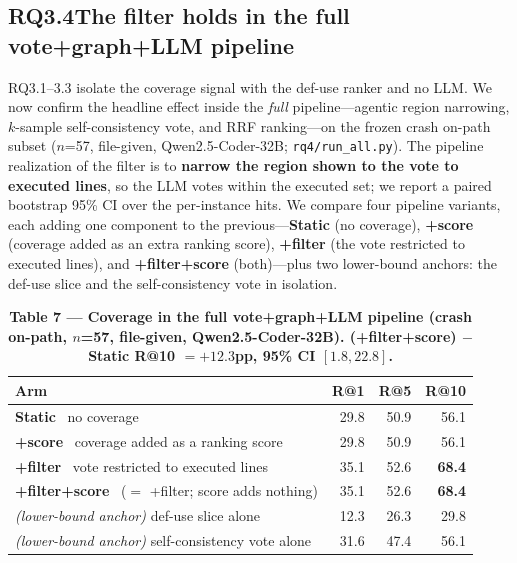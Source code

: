 \documentclass[11pt]{article}
\newcommand{\code}[1]{\texttt{#1}}
\begin{document}
\subsection*{RQ3.4\quad The filter holds in the full vote+graph+LLM pipeline}
RQ3.1--3.3 isolate the coverage signal with the def-use ranker and no LLM. We now confirm the headline effect inside the \emph{full} pipeline---agentic region narrowing, $k$-sample self-consistency vote, and RRF ranking---on the frozen crash on-path subset ($n$=57, file-given, Qwen2.5-Coder-32B; \code{rq4/run\_all.py}). The pipeline realization of the filter is to \textbf{narrow the region shown to the vote to executed lines}, so the LLM votes within the executed set; we report a paired bootstrap 95\% CI over the per-instance hits. We compare four pipeline variants, each adding one component to the previous---\textbf{Static} (no coverage), \textbf{+score} (coverage added as an extra ranking score), \textbf{+filter} (the vote restricted to executed lines), and \textbf{+filter+score} (both)---plus two lower-bound anchors: the def-use slice and the self-consistency vote in isolation.

\begin{table}[t]
\centering\small
\caption*{\textbf{Table 7 --- Coverage in the full vote+graph+LLM pipeline (crash on-path, $n$=57, file-given, Qwen2.5-Coder-32B). (+filter+score) $-$ Static R@10 $=+12.3$pp, 95\% CI $[1.8, 22.8]$.}}
\setlength{\tabcolsep}{9pt}
\begin{tabular}{lrrr}
\toprule
Arm & R@1 & R@5 & R@10 \\
\midrule
\textbf{Static} \ no coverage & 29.8 & 50.9 & 56.1 \\
\textbf{+score} \ coverage added as a ranking score & 29.8 & 50.9 & 56.1 \\
\textbf{+filter} \ vote restricted to executed lines & 35.1 & 52.6 & \textbf{68.4} \\
\textbf{+filter+score} \ ($=$ +filter; score adds nothing) & 35.1 & 52.6 & \textbf{68.4} \\
\midrule
\emph{(lower-bound anchor)} def-use slice alone & 12.3 & 26.3 & 29.8 \\
\emph{(lower-bound anchor)} self-consistency vote alone & 31.6 & 47.4 & 56.1 \\
\bottomrule
\end{tabular}
\end{table}
\end{document}
